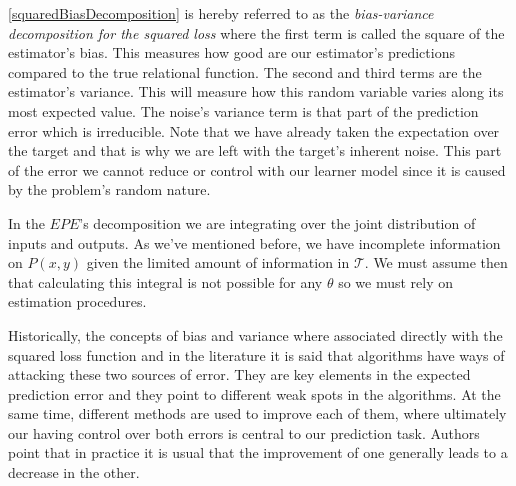  \cref{squaredBiasDecomposition} is hereby referred to as the \textit{bias-variance decomposition for the squared loss} where the first term is called the square of the estimator's bias.
This measures how good are our estimator's predictions compared to the true relational function.
The second and third terms are the estimator's variance.
This will measure how this random variable varies along its most expected value.
The noise's variance term is that part of the prediction error which is irreducible.
Note that we have already taken the expectation over the target and that is why we are left with the target's inherent noise.
This part of the error we cannot reduce or control with our learner model since it is caused by the problem's random nature.

In the $EPE$'s decomposition we are integrating over the joint distribution of inputs and outputs.
As we've mentioned before, we have incomplete information on $P(x,y)$ given the limited amount of information in $\mathcal{T}$.
We must assume then that calculating this integral is not possible for any $\theta$ so we must rely on estimation procedures.


Historically, the concepts of bias and variance where associated directly with the squared loss function and in the literature it is said that algorithms have ways of attacking these two sources of error.
They are key elements in the expected prediction error and they point to different weak spots in the algorithms.
At the same time, different methods are used to improve each of them, where ultimately our having control over both errors is central to our prediction task.
Authors point that in practice it is usual that the improvement of one generally leads to a decrease in the other.

%

